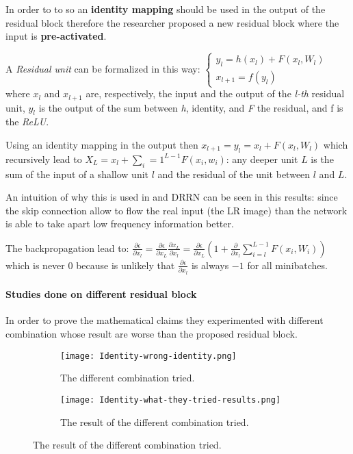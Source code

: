 In order to to so an \textbf{identity mapping} should be used in the output of the residual block therefore the researcher proposed a new residual block where the input is \textbf{pre-activated}.

A \textit{Residual unit} can be formalized in this way:
$
\begin{cases}
    y_l = h(x_l) + F(x_l,W_l) \\
    x_{l+1} = f(y_l)
\end{cases}
$ where $x_l$ and $x_{l+1}$ are, respectively, the input and the output of the \textit{l-th} residual unit, $y_l$ is the output of the sum between \textit{h}, identity, and \textit{F} the residual, and f is the \textit{ReLU}.

Using an identity mapping in the output then $x_{l+1} = y_l = x_l + F(x_l,W_l)$ which recursively lead to $X_L = x_l + \sum_i=1^{L-1} F(x_i,w_i)$: any deeper unit $L$ is the sum of the input of a shallow unit $l$ and the residual of the unit between $l$ and $L$.

An intuition of why this is used in  and DRRN\cite{DRRN} can be seen in this results: since the skip connection allow to flow the real input (the LR image) than the network is able to take apart low frequency information better.

The backpropagation lead to:
$
\frac{\partial\epsilon}{\partial x_l} = \frac{\partial\epsilon}{\partial x_L} \frac{\partial x_L}{\partial x_l} = \frac{\partial\epsilon}{\partial x_L} \left(1 + \frac{\partial}{\partial x_l} \sum_{i=l}^{L-1} F(x_i,W_i)\right)
$
which is never 0 because is unlikely that $\frac{\partial\epsilon}{\partial x_l}$ is always $-1$ for all minibatches.

\paragraph{Studies done on different residual block}
In order to prove the mathematical claims they experimented with different combination whose result are worse than the proposed residual block.

\begin{figure}[H]
    \begin{subfigure}{\textwidth}
        \centering
        \texttt{[image: Identity-wrong-identity.png]}    
        \caption{The different combination tried.}
    \end{subfigure}
    \begin{subfigure}{\textwidth}
        \centering
        \texttt{[image: Identity-what-they-tried-results.png]}    
        \caption{The result of the different combination tried.}        
    \end{subfigure}
\end{figure}

